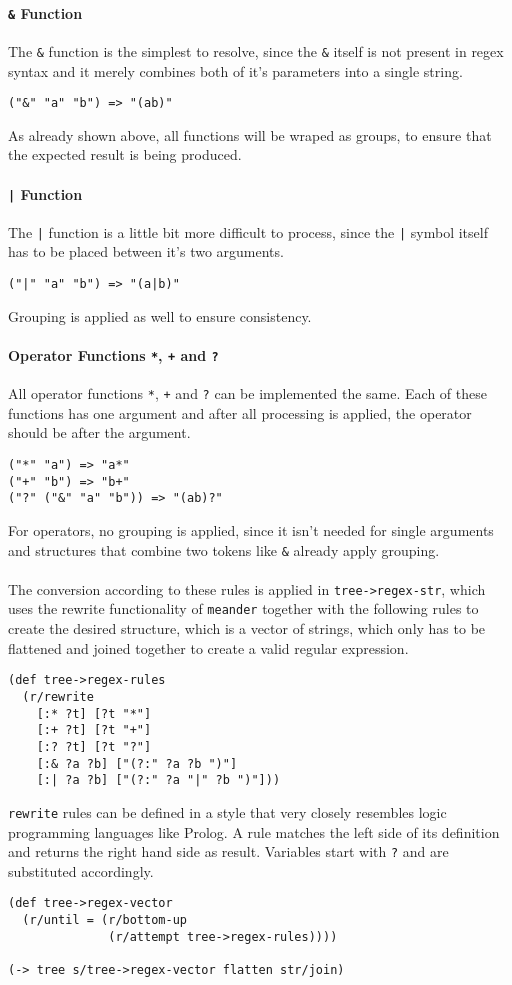 \documentclass[runningheads]{llncs}
\begin{document}
\paragraph{\texttt{\&} Function}
The \texttt{\&} function is the simplest to resolve, since the \texttt{\&} itself is not present in regex syntax and it merely combines both of it's parameters into a single string.
\begin{verbatim}
("&" "a" "b") => "(ab)"
\end{verbatim}
As already shown above, all functions will be wraped as groups, to ensure that the expected result is being produced.

\paragraph{\texttt{|} Function}
The \texttt{|} function is a little bit more difficult to process, since the \texttt{|} symbol itself has to be placed between it's two arguments.
\begin{verbatim}
("|" "a" "b") => "(a|b)"
\end{verbatim}
Grouping is applied as well to ensure consistency.

\paragraph{Operator Functions \texttt{*}, \texttt{+} and \texttt{?}}
All operator functions \texttt{*}, \texttt{+} and \texttt{?} can be implemented the same. Each of these functions has one argument and after all processing is applied, the operator should be after the argument.
\begin{verbatim}
("*" "a") => "a*"
("+" "b") => "b+"
("?" ("&" "a" "b")) => "(ab)?"
\end{verbatim}
For operators, no grouping is applied, since it isn't needed for single arguments and structures that combine two tokens like \texttt{\&} already apply grouping.
\\\\
The conversion according to these rules is applied in \texttt{tree->regex-str}, which uses the rewrite functionality of \texttt{meander} together with the following rules to create the desired structure, which is a vector of strings, which only has to be flattened and joined together to create a valid regular expression.
\begin{lstlisting}
(def tree->regex-rules
  (r/rewrite
    [:* ?t] [?t "*"]
    [:+ ?t] [?t "+"]
    [:? ?t] [?t "?"]
    [:& ?a ?b] ["(?:" ?a ?b ")"]
    [:| ?a ?b] ["(?:" ?a "|" ?b ")"]))
\end{lstlisting}
\texttt{rewrite} rules can be defined in a style that very closely resembles logic programming languages like Prolog. A rule matches the left side of its definition and returns the right hand side as result. Variables start with \texttt{?} and are substituted accordingly.
\begin{lstlisting}
(def tree->regex-vector
  (r/until = (r/bottom-up
              (r/attempt tree->regex-rules))))

(-> tree s/tree->regex-vector flatten str/join)
\end{lstlisting}
\end{document}
